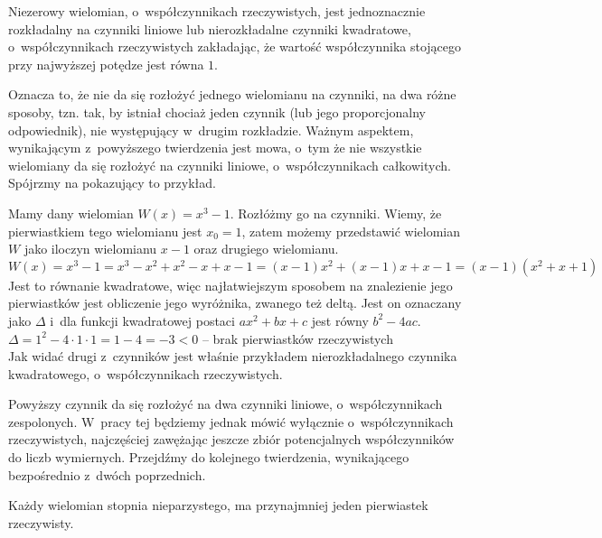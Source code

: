 \begin{theorem}
	$ $\\
	Niezerowy wielomian, o~współczynnikach rzeczywistych, jest jednoznacznie rozkładalny na czynniki liniowe lub nierozkładalne czynniki kwadratowe, o~współczynnikach rzeczywistych zakładając, że wartość współczynnika stojącego przy najwyższej potędze jest równa $1$.
\end{theorem}

Oznacza to, że nie da się rozłożyć jednego wielomianu na czynniki, na dwa różne sposoby, tzn. tak, by istniał chociaż jeden czynnik (lub jego proporcjonalny odpowiednik), nie występujący w~drugim rozkładzie. Ważnym aspektem, wynikającym z~powyższego twierdzenia jest mowa, o~tym że nie wszystkie wielomiany da się rozłożyć na czynniki liniowe, o~współczynnikach całkowitych. Spójrzmy na pokazujący to przykład.

\begin{example}
	$ $\\
	Mamy dany wielomian $W(x)=x^3-1$. Rozłóżmy go na czynniki.
	Wiemy, że pierwiastkiem tego wielomianu jest $x_0 = 1$, zatem możemy przedstawić wielomian $W$ jako iloczyn wielomianu $x-1$ oraz drugiego wielomianu. \\
	$W(x)=x^3-1=x^3-x^2+x^2-x+x-1=(x-1)x^2+(x-1)x+x-1 = (x-1)(x^2+x+1)$ \\
	Jest to równanie kwadratowe, więc najłatwiejszym sposobem na znalezienie jego pierwiastków jest obliczenie jego wyróżnika, zwanego też deltą. Jest on oznaczany jako $\Delta$ i~dla funkcji kwadratowej postaci $ax^2+bx+c$ jest równy $b^2-4ac$. \\
	$\Delta = 1^2 - 4 \cdot 1 \cdot 1 = 1 - 4 = -3 < 0$ -- brak pierwiastków rzeczywistych\\
	Jak widać drugi z~czynników jest właśnie przykładem nierozkładalnego czynnika kwadratowego, o~współczynnikach rzeczywistych.
\end{example}

Powyższy czynnik da się rozłożyć na dwa czynniki liniowe, o~współczynnikach zespolonych. W~pracy tej będziemy jednak mówić wyłącznie o~współczynnikach rzeczywistych, najczęściej zawężając jeszcze zbiór potencjalnych współczynników do liczb wymiernych. Przejdźmy do kolejnego twierdzenia, wynikającego bezpośrednio z~dwóch poprzednich.

\begin{theorem}
	$ $\\
	Każdy wielomian stopnia nieparzystego, ma przynajmniej jeden pierwiastek rzeczywisty.
\end{theorem}

